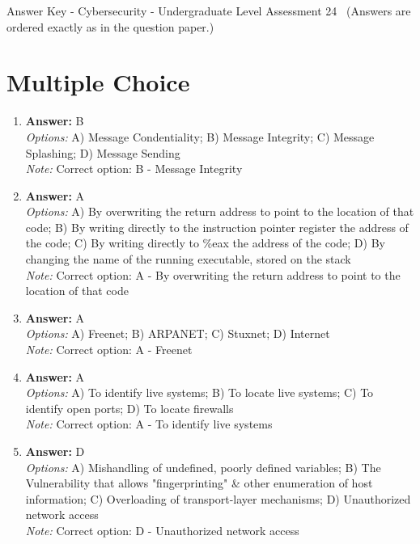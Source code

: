 \documentclass[12pt]{article}
\begin{document}
\begin{center}
Answer Key - Cybersecurity - Undergraduate Level Assessment 24 \
\small (Answers are ordered exactly as in the question paper.)
\end{center}

\section*{Multiple Choice}
\begin{enumerate}[label=\arabic*.]
\item \textbf{Answer:} B
\\ \textit{Options:} A) Message Condentiality; B) Message Integrity; C) Message Splashing; D) Message Sending
\\ \textit{Note:} Correct option: B - Message Integrity
\item \textbf{Answer:} A
\\ \textit{Options:} A) By overwriting the return address to point to the location of that code; B) By writing directly to the instruction pointer register the address of the code; C) By writing directly to \%eax the address of the code; D) By changing the name of the running executable, stored on the stack
\\ \textit{Note:} Correct option: A - By overwriting the return address to point to the location of that code
\item \textbf{Answer:} A
\\ \textit{Options:} A) Freenet; B) ARPANET; C) Stuxnet; D) Internet
\\ \textit{Note:} Correct option: A - Freenet
\item \textbf{Answer:} A
\\ \textit{Options:} A) To identify live systems; B) To locate live systems; C) To identify open ports; D) To locate firewalls
\\ \textit{Note:} Correct option: A - To identify live systems
\item \textbf{Answer:} D
\\ \textit{Options:} A) Mishandling of undefined, poorly defined variables; B) The Vulnerability that allows "fingerprinting" \& other enumeration of host information; C) Overloading of transport-layer mechanisms; D) Unauthorized network access
\\ \textit{Note:} Correct option: D - Unauthorized network access
\end{enumerate}
\end{document}
